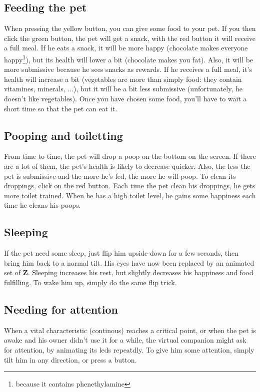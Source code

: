 \documentclass[a4paper]{article}
\begin{document}
\subsection{Feeding the pet}
When pressing the yellow button, you can give some food to your pet. If you then click the green button, the pet will get a snack, with the red button it will receive a full meal. If  he eats a snack, it will be more happy (chocolate makes everyone happy\footnote{because it contains phenethylamine}), but its health will lower a bit (chocolate makes you fat). Also, it will be more submissive because he sees snacks as rewards. If he receives a full meal, it's health will increase a bit (vegetables are more than simply food: they contain vitamines, minerals, ...), but it will be a bit less submissive (unfortunately, he doesn't like vegetables). Once you have chosen some food, you'll have to wait a short time so that the pet can eat it.

\subsection{Pooping and toiletting}
From time to time, the pet will drop a poop on the bottom on the screen. If there are a lot of them, the pet's health is likely to decrease quicker. Also, the less the pet is submissive and the more he's fed, the more he will poop. To clean its droppings, click on the red button. Each time the pet clean his droppings, he gets more toilet trained. When he has a high toilet level, he gains some happiness each time he cleans his poops.

\subsection{Sleeping}
If the pet need some sleep, just flip him upside-down for a few seconds, then bring him back to a normal tilt. His eyes have now been replaced by an animated set of \textbf{Z}. Sleeping increases his rest, but slightly decreases his happiness and food fulfilling. To wake him up, simply do the same flip trick.

\subsection{Needing for attention}
When a vital characteristic (continous) reaches a critical point, or when the pet is awake and his owner didn't use it for a while, the virtual companion might ask for attention, by animating its leds repeatdly. To give him some attention, simply tilt him in any direction, or press a button.
\end{document}
